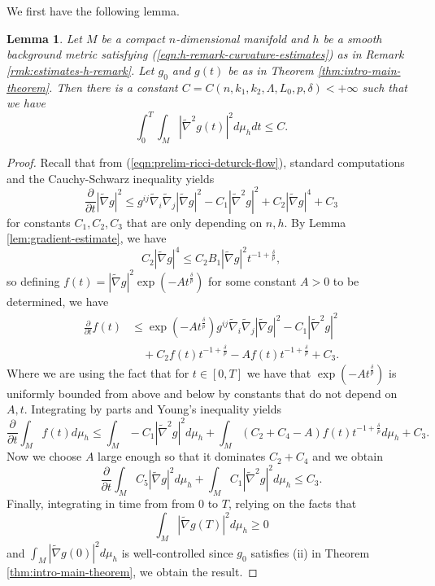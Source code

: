 \documentclass[12pt]{amsart}
\theoremstyle{plain}
\theoremstyle{plain}
\newtheorem{lemma}[subsection]{Lemma}
\theoremstyle{definition}
\theoremstyle{remark}
\numberwithin{equation}{subsection}
\newcommand{\hdel}{\tilde{\nabla}}
\begin{document}
We first have the following lemma.

\begin{lemma}\label{lem:hessiansquared-spacetime-integrability}
    Let $M$ be a compact $n$-dimensional manifold and $h$ be a smooth background metric satisfying (\ref{eqn:h-remark-curvature-estimates}) as in Remark \ref{rmk:estimates-h-remark}. Let $g_0$ and $g(t)$ be as in Theorem \ref{thm:intro-main-theorem}. Then there is a constant $C = C(n, k_1, k_2, \Lambda, L_0, p, \delta) < +\infty$ such that we have
    \begin{equation*}
        \int_0^T \int_M |\hdel^2 g(t)|^2 d\mu_h dt \leq C.
    \end{equation*}
\end{lemma}

\begin{proof}
    Recall that from (\ref{eqn:prelim-ricci-deturck-flow}), standard computations and the Cauchy-Schwarz inequality yields
    \begin{equation*}
        \frac{\partial}{\partial t} |\hdel g|^2 \leq g^{ij}\hdel_i\hdel_j |\hdel g|^2 - C_1 |\hdel^2 g|^2 + C_2|\hdel g|^4 + C_3
    \end{equation*}
    for constants $C_1, C_2, C_3$ that are only depending on $n, h$. By Lemma \ref{lem:gradient-estimate}, we have
    \begin{equation*}
        C_2|\hdel g|^4 \leq C_2B_1|\hdel g|^2t^{-1+\frac{\delta}{p}},
    \end{equation*}
    so defining $f(t) = |\hdel g|^2\exp\left(-At^\frac{\delta}{p}\right)$ for some constant $A > 0$ to be determined, we have
    \begin{align*}
        \frac{\partial}{\partial t} f(t) &\leq \exp\left(-At^\frac{\delta}{p}\right)g^{ij}\hdel_i\hdel_j|\hdel g|^2 - C_1|\hdel^2 g|^2 \nonumber \\
        &\quad + C_2f(t)t^{-1+\frac{\delta}{p}} - Af(t)t^{-1+\frac{\delta}{p}} + C_3.
    \end{align*}
    Where we are using the fact that for $t \in [0, T]$ we have that $\exp\left(-At^\frac{\delta}{p}\right)$ is uniformly bounded from above and below by constants that do not depend on $A, t$. Integrating by parts and Young's inequality yields
    \begin{equation*}
        \frac{\partial}{\partial t} \int_M f(t)d\mu_h \leq \int_M -C_1|\hdel^2g|^2d\mu_h + \int_M\left(C_2+C_4-A\right)f(t)t^{-1+\frac{\delta}{p}}d\mu_h + C_3.
    \end{equation*}
    Now we choose $A$ large enough so that it dominates $C_2 + C_4$ and we obtain
    \begin{equation*}
        \frac{\partial}{\partial t} \int_M C_5|\hdel g|^2d\mu_h + \int_M C_1|\hdel^2 g|^2d\mu_h \leq C_3.
    \end{equation*}
    Finally, integrating in time from from $0$ to $T$, relying on the facts that 
    \begin{equation*}
        \int_M |\hdel g(T)|^2 d\mu_h \geq 0
    \end{equation*}
    and $\int_M |\hdel g(0)|^2 d\mu_h$ is well-controlled since $g_0$ satisfies (ii) in Theorem \ref{thm:intro-main-theorem}, we obtain the result.
\end{proof}
\end{document}
